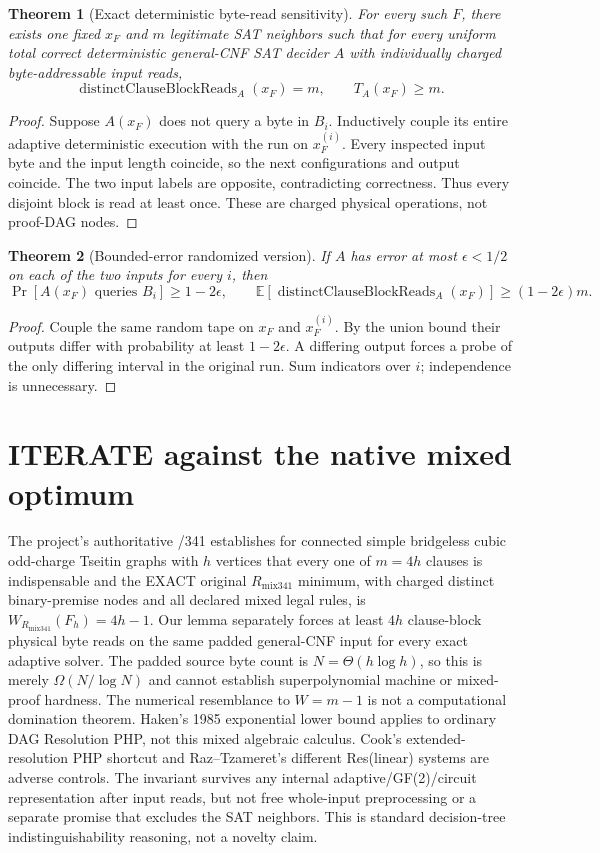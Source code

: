 \documentclass[11pt]{article}
\newtheorem{theorem}{Theorem}
\begin{document}
\begin{theorem}[Exact deterministic byte-read sensitivity]
For every such $F$, there exists one fixed $x_F$ and $m$ legitimate SAT neighbors such that for every uniform total correct deterministic general-CNF SAT decider $A$ with individually charged byte-addressable input reads,
\[
\operatorname{distinctClauseBlockReads}_A(x_F)=m,\qquad T_A(x_F)\ge m.
\]
\end{theorem}
\begin{proof}
Suppose $A(x_F)$ does not query a byte in $B_i$. Inductively couple its entire adaptive deterministic execution with the run on $x_F^{(i)}$. Every inspected input byte and the input length coincide, so the next configurations and output coincide. The two input labels are opposite, contradicting correctness. Thus every disjoint block is read at least once. These are charged physical operations, not proof-DAG nodes.
\end{proof}

\begin{theorem}[Bounded-error randomized version]
If $A$ has error at most $\epsilon<1/2$ on each of the two inputs for every $i$, then
\[
\Pr[A(x_F)\text{ queries }B_i]\ge1-2\epsilon,\qquad
\mathbb E[\operatorname{distinctClauseBlockReads}_A(x_F)]\ge(1-2\epsilon)m.
\]
\end{theorem}
\begin{proof}
Couple the same random tape on $x_F$ and $x_F^{(i)}$. By the union bound their outputs differ with probability at least $1-2\epsilon$. A differing output forces a probe of the only differing interval in the original run. Sum indicators over $i$; independence is unnecessary.
\end{proof}

\section*{ITERATE against the native mixed optimum}
The project's authoritative /341 establishes for connected simple bridgeless cubic odd-charge Tseitin graphs with $h$ vertices that every one of $m=4h$ clauses is indispensable and the EXACT original $R_{\mathrm{mix341}}$ minimum, with charged distinct binary-premise nodes and all declared mixed legal rules, is $W_{R_{\mathrm{mix341}}}(F_h)=4h-1$. Our lemma separately forces at least $4h$ clause-block physical byte reads on the same padded general-CNF input for every exact adaptive solver. The padded source byte count is $N=\Theta(h\log h)$, so this is merely $\Omega(N/\log N)$ and cannot establish superpolynomial machine or mixed-proof hardness. The numerical resemblance to $W=m-1$ is not a computational domination theorem. Haken's 1985 exponential lower bound applies to ordinary DAG Resolution PHP, not this mixed algebraic calculus. Cook's extended-resolution PHP shortcut and Raz--Tzameret's different Res(linear) systems are adverse controls. The invariant survives any internal adaptive/GF(2)/circuit representation after input reads, but not free whole-input preprocessing or a separate promise that excludes the SAT neighbors. This is standard decision-tree indistinguishability reasoning, not a novelty claim.
\end{document}

